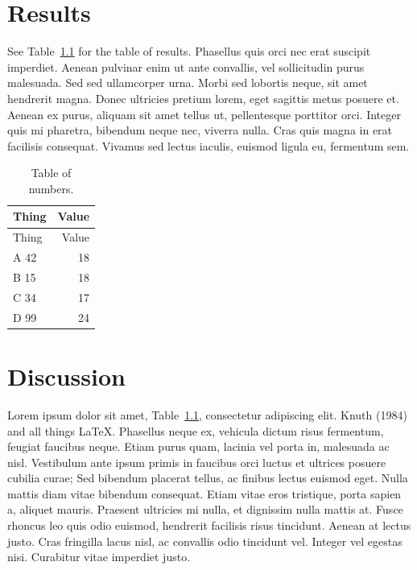 \documentclass[
  oneside,
  open=any]{scrbook}
\begin{document}
\hypertarget{results}{%
\chapter{Results}\label{results}}

See Table~\ref{tbl-numbers} for the table of results. Phasellus quis
orci nec erat suscipit imperdiet. Aenean pulvinar enim ut ante
convallis, vel sollicitudin purus malesuada. Sed sed ullamcorper urna.
Morbi sed lobortis neque, sit amet hendrerit magna. Donec ultricies
pretium lorem, eget sagittis metus posuere et. Aenean ex purus, aliquam
sit amet tellus ut, pellentesque porttitor orci. Integer quis mi
pharetra, bibendum neque nec, viverra nulla. Cras quis magna in erat
facilisis consequat. Vivamus sed lectus iaculis, euismod ligula eu,
fermentum sem.

\hypertarget{tbl-numbers}{}
\begin{longtable}[]{@{}lr@{}}
\caption{\label{tbl-numbers}Table of numbers.}\tabularnewline
\toprule()
Thing & Value \\
\midrule()
\endfirsthead
\toprule()
Thing & Value \\
\midrule()
\endhead
A 42 & 18 \\
B 15 & 18 \\
C 34 & 17 \\
D 99 & 24 \\
\bottomrule()
\end{longtable}

\hypertarget{discussion}{%
\chapter{Discussion}\label{discussion}}

Lorem ipsum dolor sit amet, Table~\ref{tbl-numbers}, consectetur
adipiscing elit. Knuth (1984) and all things LaTeX. Phasellus neque ex,
vehicula dictum risus fermentum, feugiat faucibus neque. Etiam purus
quam, lacinia vel porta in, malesuada ac nisl. Vestibulum ante ipsum
primis in faucibus orci luctus et ultrices posuere cubilia curae; Sed
bibendum placerat tellus, ac finibus lectus euismod eget. Nulla mattis
diam vitae bibendum consequat. Etiam vitae eros tristique, porta sapien
a, aliquet mauris. Praesent ultricies mi nulla, et dignissim nulla
mattis at. Fusce rhoncus leo quis odio euismod, hendrerit facilisis
risus tincidunt. Aenean at lectus justo. Cras fringilla lacus nisl, ac
convallis odio tincidunt vel. Integer vel egestas nisi. Curabitur vitae
imperdiet justo.
\end{document}
